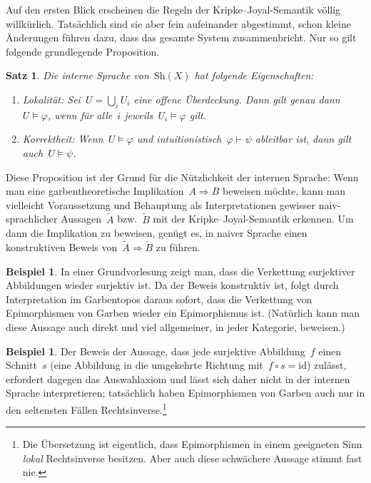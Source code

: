 \documentclass[a4paper,ngerman,12pt]{scrartcl}
\theoremstyle{definition}
\newtheorem{bsp}[defn]{Beispiel}
\theoremstyle{plain}
\newtheorem{satz}[defn]{Satz}
\theoremstyle{remark}
\newcommand{\Sh}{\mathrm{Sh}}
\newcommand{\id}{\mathrm{id}}
\newcommand{\seq}[1]{\mathrel{\vdash\!\!\!_{#1}}}
\renewcommand{\_}{\mathpunct{.}\,}
\newcommand{\?}{\,{:}\,}
\begin{document}
Auf den ersten Blick erscheinen die Regeln der Kripke--Joyal-Semantik völlig
willkürlich. Tatsächlich sind sie aber fein aufeinander abgestimmt, schon
kleine Änderungen führen dazu, dass das gesamte System zusammenbricht. Nur so
gilt folgende grundlegende Proposition.

\begin{satz}\label{soundness}%
Die interne Sprache von~$\Sh(X)$ hat folgende Eigenschaften:
\begin{enumerate}
\item \emph{Lokalität:} Sei~$U = \bigcup_i U_i$ eine offene Überdeckung. Dann
gilt genau dann~$U \models \varphi$, wenn für alle~$i$ jeweils~$U_i \models
\varphi$ gilt.
\item \emph{Korrektheit:} Wenn~$U \models \varphi$ und
intuitionistisch~$\varphi \seq{} \psi$ ableitbar ist, dann gilt auch~$U \models
\psi$.
\end{enumerate}
\end{satz}

Diese Proposition ist der Grund für die Nützlichkeit der internen Sprache: Wenn
man eine garbentheoretische Implikation~$A \Rightarrow B$ beweisen möchte, kann man vielleicht
Voraussetzung und Behauptung als Interpretationen gewisser naiv-sprachlicher
Aussagen~$\tilde A$ bzw.~$\tilde B$ mit der Kripke--Joyal-Semantik erkennen. Um
dann die Implikation zu beweisen, genügt es, in naiver Sprache einen
konstruktiven Beweis von~$\tilde A \Rightarrow \tilde B$ zu führen.

\begin{bsp}In einer Grundvorlesung zeigt man, dass die Verkettung surjektiver
Abbildungen wieder surjektiv ist. Da der Beweis konstruktiv ist, folgt durch
Interpretation im Garbentopos daraus sofort, dass die Verkettung von
Epimorphismen von Garben wieder ein Epimorphismus ist. (Natürlich kann man
diese Aussage auch direkt und viel allgemeiner, in jeder Kategorie,
beweisen.)\end{bsp}

\begin{bsp}
Der Beweis der Aussage, dass jede
surjektive Abbildung~$f$ einen Schnitt~$s$ (eine Abbildung in die umgekehrte
Richtung mit~$f \circ s = \id$) zulässt, erfordert dagegen das Auswahlaxiom und
lässt sich daher nicht in der internen Sprache interpretieren; tatsächlich
haben Epimorphismen von Garben auch nur in den seltensten Fällen
Rechtsinverse.\footnote{Die Übersetzung ist eigentlich, dass Epimorphismen
in einem geeigneten Sinn \emph{lokal} Rechtsinverse besitzen. Aber auch diese
schwächere Aussage stimmt fast nie.}\end{bsp}
\end{document}
